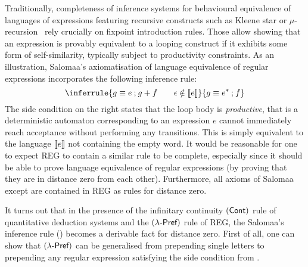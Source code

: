  Traditionally, completeness of inference systems for behavioural equivalence of languages of expressions featuring recursive constructs such as Kleene star or $\mu$-recursion~\cite{Milner:1984:Complete} rely crucially on fixpoint introduction rules. Those allow showing that an expression is provably equivalent to a looping construct if it exhibits some form of self-similarity, typically subject to productivity constraints. As an illustration, Salomaa's axiomatisation of language equivalence of regular expressions incorporates the following inference rule:
\begin{equation}\label{c2:eq:salomaa}
	\inferrule{g \equiv e \seq g + f \qquad \emptyword \notin \sem{e}}{g \equiv e^\ast \seq f}
\end{equation}
The side condition on the right states that the loop body is \emph{productive}, that is a deterministic automaton corresponding to an expression $e$ cannot immediately reach acceptance without performing any transitions. This is simply equivalent to the language $\left\llbracket{e}\right\rrbracket$ not containing the empty word. It would be reasonable for one to expect \textsf{REG} to contain a similar rule to be complete, especially since it should be able to prove language equivalence of regular expressions (by proving that they are in distance zero from each other). Furthermore, all axioms of Salomaa except  are contained in \textsf{REG} as rules for distance zero.

It turns out that in the presence of the infinitary continuity $(\textsf{Cont})$ rule of quantitative deduction systems and the $(\textsf{$\lambda$-Pref})$ rule of \textsf{REG}, the Salomaa's inference rule () becomes a derivable fact for distance zero. First of all, one can show that $(\textsf{$\lambda$-Pref})$ can be generalised from prepending single letters to prepending any regular expression satisfying the side condition from .


